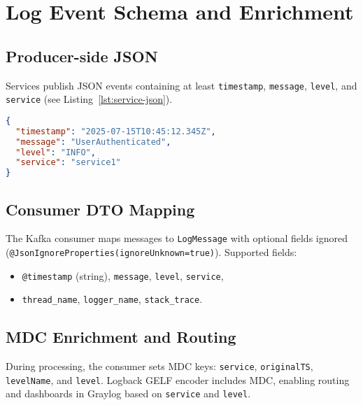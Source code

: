 \documentclass[12pt,a4paper]{report}
\begin{document}
\section{Log Event Schema and Enrichment}
\subsection{Producer-side JSON}
Services publish JSON events containing at least \texttt{timestamp}, \texttt{message}, \texttt{level}, and \texttt{service} (see Listing~\ref{lst:service-json}).
\begin{lstlisting}[language=JSON,caption={Minimal producer event structure (service1/service2)},label={lst:service-json}]
{
  "timestamp": "2025-07-15T10:45:12.345Z",
  "message": "UserAuthenticated",
  "level": "INFO",
  "service": "service1"
}
\end{lstlisting}

\subsection{Consumer DTO Mapping}
The Kafka consumer maps messages to \texttt{LogMessage} with optional fields ignored (\texttt{@JsonIgnoreProperties(ignoreUnknown=true)}). Supported fields:
\begin{itemize}[leftmargin=1.2cm]
  \item \texttt{@timestamp} (string), \texttt{message}, \texttt{level}, \texttt{service},
  \item \texttt{thread\_name}, \texttt{logger\_name}, \texttt{stack\_trace}.
\end{itemize}

\subsection{MDC Enrichment and Routing}
During processing, the consumer sets MDC keys: \texttt{service}, \texttt{originalTS}, \texttt{levelName}, and \texttt{level}. Logback GELF encoder includes MDC, enabling routing and dashboards in Graylog based on \texttt{service} and \texttt{level}.
\end{document}
